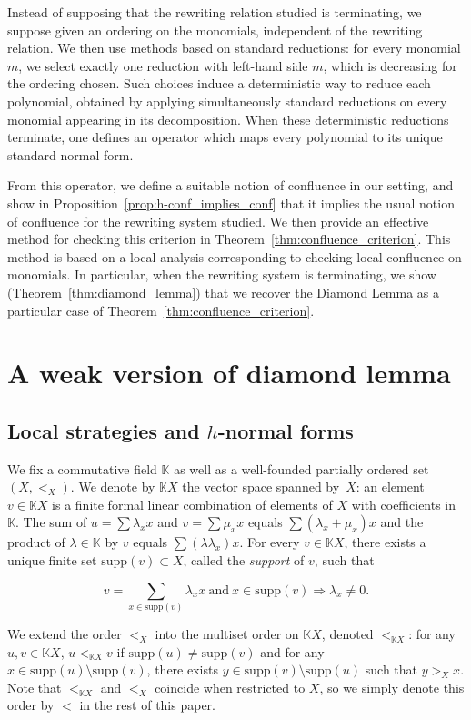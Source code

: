 \documentclass[10pt]{easychair}
\theoremstyle{definition}
\newcommand\K{\mathbb{K}}
\newcommand\KX{\K X}
\newcommand\supp{\text{supp}}
\begin{document}
Instead of supposing that the rewriting relation studied is
terminating, we suppose given an ordering on the monomials,
independent of the rewriting relation.  We then use methods based on
standard reductions: for every monomial $m$, we select exactly one
reduction with left-hand side $m$, which is decreasing for the
ordering chosen. Such choices induce a deterministic way to reduce
each polynomial, obtained by applying simultaneously standard
reductions on every monomial appearing in its decomposition. When
these deterministic reductions terminate, one defines an operator
which maps every polynomial to its unique standard normal form.

From this operator, we define a suitable notion of confluence in
our setting, and show in Proposition~\ref{prop:h-conf_implies_conf}
that it implies the usual notion of confluence for the rewriting
system studied. We then provide an effective method for checking this
criterion in Theorem~\ref{thm:confluence_criterion}. This method is
based on a local analysis corresponding to checking local confluence
on monomials. In particular, when the rewriting system is terminating,
we show (Theorem~\ref{thm:diamond_lemma}) that we recover the Diamond
Lemma as a particular case of Theorem~\ref{thm:confluence_criterion}.

\section{A weak version of diamond lemma}

\subsection{Local strategies and $h$-normal forms}

We fix a commutative field $\K$ as well as a well-founded partially ordered set
$(X,<_X)$. We denote by $\KX$ the vector space spanned by~$X$: an element
$v\in\KX$ is a finite formal linear combination of elements of $X$ with
coefficients in $\K$.  The sum of
$u=\sum\lambda_xx$ and $v=\sum\mu_xx$ equals $\sum(\lambda_x+\mu_x)x$ and
the product of $\lambda\in\K$ by $v$ equals $\sum(\lambda\lambda_x)x$.
For every $v\in\KX$, there exists a
unique finite set $\supp(v)\subset X$, called the \emph{support} of $v$,
such that
\begin{small}
  \begin{equation}\label{equ:support}
    v=\sum_{x\in\supp(v)}\lambda_xx\ \text{and}\ x\in\supp(v)\Rightarrow\lambda_x
    \neq 0.
  \end{equation}
\end{small}
\smallskip
\noindent
We
extend the order $<_X$ into the multiset order on $\KX$, denoted $<_{\KX}$:
for any $u,v \in \KX$, $u<_{\KX}v$ if $\supp(u) \neq \supp(v)$ and for any $x\in\supp(u)\setminus\supp(v)$, there
exists $y\in\supp(v)\setminus\supp(u)$ such that $y>_Xx$. Note that $<_{\KX}$ and $<_X$ coincide when restricted to $X$,
so we simply denote this order by $<$ in the rest of this paper.
\end{document}
